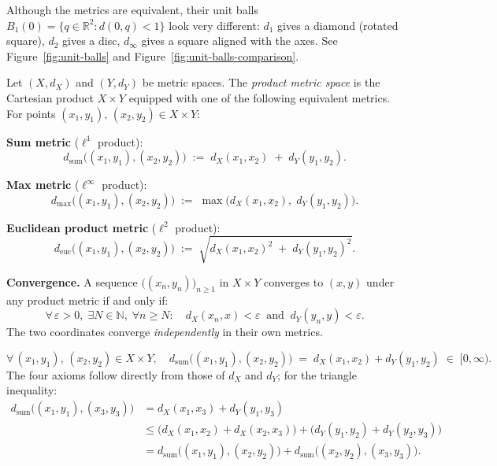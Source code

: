 \begin{remark*}
Although the metrics are equivalent, their unit balls
$B_1(0) = \{q \in \mathbb{R}^2 : d(0, q) < 1\}$ look very different:
$d_1$ gives a diamond (rotated square),
$d_2$ gives a disc,
$d_\infty$ gives a square aligned with the axes.
See Figure~\ref{fig:unit-balls} and Figure~\ref{fig:unit-balls-comparison}.
\end{remark*}


\begin{tcolorbox}[colback=propbox, colframe=propborder, arc=2pt,
  left=6pt, right=6pt, top=4pt, bottom=4pt,
  title={\small\textbf{Definition (Product Metric Space)}},
  fonttitle=\small\bfseries]
\begin{definition}
\label{def:product-metric}
Let $(X, d_X)$ and $(Y, d_Y)$ be metric spaces.
The \emph{product metric space} is the Cartesian product $X \times Y$
equipped with one of the following equivalent metrics.
For points $(x_1, y_1),\, (x_2, y_2) \in X \times Y$:

\medskip
\noindent\textbf{Sum metric} ($\ell^1$ product):
\[
d_{\mathrm{sum}}\bigl((x_1,y_1),(x_2,y_2)\bigr)
\;:=\; d_X(x_1,x_2) \;+\; d_Y(y_1,y_2).
\]

\noindent\textbf{Max metric} ($\ell^\infty$ product):
\[
d_{\max}\bigl((x_1,y_1),(x_2,y_2)\bigr)
\;:=\; \max\bigl(d_X(x_1,x_2),\; d_Y(y_1,y_2)\bigr).
\]

\noindent\textbf{Euclidean product metric} ($\ell^2$ product):
\[
d_{\mathrm{euc}}\bigl((x_1,y_1),(x_2,y_2)\bigr)
\;:=\; \sqrt{d_X(x_1,x_2)^2 \;+\; d_Y(y_1,y_2)^2}.
\]

\medskip
\noindent\textbf{Convergence.}\quad
A sequence $\bigl((x_n, y_n)\bigr)_{n \ge 1}$ in $X \times Y$ converges
to $(x, y)$ under any product metric if and only if:
\[
\forall\,\varepsilon > 0,\;\exists N \in \mathbb{N},\;
\forall n \ge N:\quad
d_X(x_n, x) < \varepsilon
\;\;\text{and}\;\;
d_Y(y_n, y) < \varepsilon.
\]
The two coordinates converge \emph{independently} in their own metrics.
\end{definition}
\end{tcolorbox}

\begin{remark*}
\[
\forall\,(x_1,y_1),\,(x_2,y_2) \in X \times Y, \quad
d_{\mathrm{sum}}\bigl((x_1,y_1),(x_2,y_2)\bigr)
\;=\; d_X(x_1,x_2) + d_Y(y_1,y_2) \;\in\; [0,\infty).
\]
The four axioms follow directly from those of $d_X$ and $d_Y$; for the
triangle inequality:
\begin{align*}
d_{\mathrm{sum}}\bigl((x_1,y_1),(x_3,y_3)\bigr)
&= d_X(x_1,x_3) + d_Y(y_1,y_3) \\
&\le \bigl(d_X(x_1,x_2) + d_X(x_2,x_3)\bigr)
   + \bigl(d_Y(y_1,y_2) + d_Y(y_2,y_3)\bigr) \\
&= d_{\mathrm{sum}}\bigl((x_1,y_1),(x_2,y_2)\bigr)
 + d_{\mathrm{sum}}\bigl((x_2,y_2),(x_3,y_3)\bigr).
\end{align*}
\end{remark*}

